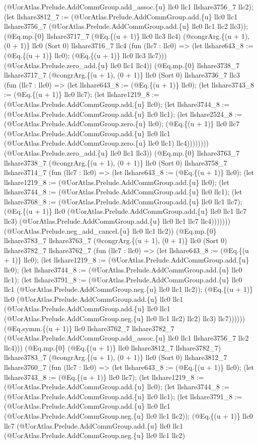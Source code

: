 \documentclass[11pt]{article}
\begin{document}
(@UorAtlas.Prelude.AddCommGroup.add\_assoc.\{u\} llc0 llc1 llshare3756\_7 llc2); (let llshare3812\_7 := (@UorAtlas.Prelude.AddCommGroup.add.\{u\} llc0 llc1 llshare3756\_7 (@UorAtlas.Prelude.AddCommGroup.add.\{u\} llc0 llc1 llc2 llc3)); (@Eq.mp.\{0\} llshare3717\_7 (@Eq.\{(u + 1)\} llc0 llc3 llc4) (@congrArg.\{(u + 1), (0 + 1)\} llc0 (Sort 0) llshare3716\_7 llc4 (fun (llc7 : llc0) => (let llshare643\_8 := (@Eq.\{(u + 1)\} llc0); (@Eq.\{(u + 1)\} llc0 llc3 llc7))) (@UorAtlas.Prelude.zero\_add.\{u\} llc0 llc1 llc4)) (@Eq.mp.\{0\} llshare3738\_7 llshare3717\_7 (@congrArg.\{(u + 1), (0 + 1)\} llc0 (Sort 0) llshare3736\_7 llc3 (fun (llc7 : llc0) => (let llshare643\_8 := (@Eq.\{(u + 1)\} llc0); (let llshare3743\_8 := (@Eq.\{(u + 1)\} llc0 llc7); (let llshare1219\_8 := (@UorAtlas.Prelude.AddCommGroup.add.\{u\} llc0); (let llshare3744\_8 := (@UorAtlas.Prelude.AddCommGroup.add.\{u\} llc0 llc1); (let llshare2524\_8 := (@UorAtlas.Prelude.AddCommGroup.zero.\{u\} llc0); (@Eq.\{(u + 1)\} llc0 llc7 (@UorAtlas.Prelude.AddCommGroup.add.\{u\} llc0 llc1 (@UorAtlas.Prelude.AddCommGroup.zero.\{u\} llc0 llc1) llc4)))))))) (@UorAtlas.Prelude.zero\_add.\{u\} llc0 llc1 llc3)) (@Eq.mp.\{0\} llshare3763\_7 llshare3738\_7 (@congrArg.\{(u + 1), (0 + 1)\} llc0 (Sort 0) llshare3758\_7 llshare3714\_7 (fun (llc7 : llc0) => (let llshare643\_8 := (@Eq.\{(u + 1)\} llc0); (let llshare1219\_8 := (@UorAtlas.Prelude.AddCommGroup.add.\{u\} llc0); (let llshare3744\_8 := (@UorAtlas.Prelude.AddCommGroup.add.\{u\} llc0 llc1); (let llshare3768\_8 := (@UorAtlas.Prelude.AddCommGroup.add.\{u\} llc0 llc1 llc7); (@Eq.\{(u + 1)\} llc0 (@UorAtlas.Prelude.AddCommGroup.add.\{u\} llc0 llc1 llc7 llc3) (@UorAtlas.Prelude.AddCommGroup.add.\{u\} llc0 llc1 llc7 llc4))))))) (@UorAtlas.Prelude.neg\_add\_cancel.\{u\} llc0 llc1 llc2)) (@Eq.mp.\{0\} llshare3783\_7 llshare3763\_7 (@congrArg.\{(u + 1), (0 + 1)\} llc0 (Sort 0) llshare3782\_7 llshare3762\_7 (fun (llc7 : llc0) => (let llshare643\_8 := (@Eq.\{(u + 1)\} llc0); (let llshare1219\_8 := (@UorAtlas.Prelude.AddCommGroup.add.\{u\} llc0); (let llshare3744\_8 := (@UorAtlas.Prelude.AddCommGroup.add.\{u\} llc0 llc1); (let llshare3791\_8 := (@UorAtlas.Prelude.AddCommGroup.add.\{u\} llc0 llc1 (@UorAtlas.Prelude.AddCommGroup.neg.\{u\} llc0 llc1 llc2)); (@Eq.\{(u + 1)\} llc0 (@UorAtlas.Prelude.AddCommGroup.add.\{u\} llc0 llc1 (@UorAtlas.Prelude.AddCommGroup.add.\{u\} llc0 llc1 (@UorAtlas.Prelude.AddCommGroup.neg.\{u\} llc0 llc1 llc2) llc2) llc3) llc7)))))) (@Eq.symm.\{(u + 1)\} llc0 llshare3762\_7 llshare3782\_7 (@UorAtlas.Prelude.AddCommGroup.add\_assoc.\{u\} llc0 llc1 llshare3756\_7 llc2 llc4))) (@Eq.mp.\{0\} (@Eq.\{(u + 1)\} llc0 llshare3812\_7 llshare3782\_7) llshare3783\_7 (@congrArg.\{(u + 1), (0 + 1)\} llc0 (Sort 0) llshare3812\_7 llshare3760\_7 (fun (llc7 : llc0) => (let llshare643\_8 := (@Eq.\{(u + 1)\} llc0); (let llshare3743\_8 := (@Eq.\{(u + 1)\} llc0 llc7); (let llshare1219\_8 := (@UorAtlas.Prelude.AddCommGroup.add.\{u\} llc0); (let llshare3744\_8 := (@UorAtlas.Prelude.AddCommGroup.add.\{u\} llc0 llc1); (let llshare3791\_8 := (@UorAtlas.Prelude.AddCommGroup.add.\{u\} llc0 llc1 (@UorAtlas.Prelude.AddCommGroup.neg.\{u\} llc0 llc1 llc2)); (@Eq.\{(u + 1)\} llc0 llc7 (@UorAtlas.Prelude.AddCommGroup.add.\{u\} llc0 llc1 (@UorAtlas.Prelude.AddCommGroup.neg.\{u\} llc0 llc1 llc2) 
\end{document}
